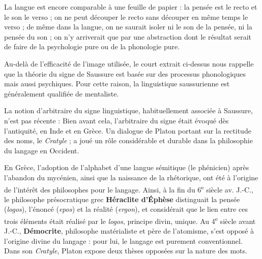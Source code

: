 \begin{lecture}{}
La langue est encore comparable à une feuille de papier : la pensée est le recto et le son le verso ; on ne peut découper le recto sans découper en même temps le verso ; de même dans la langue, on ne saurait isoler ni le son de la pensée, ni la pensée du son ; on n’y arriverait que par une abstraction dont le résultat serait de faire de la psychologie pure ou de la phonologie pure.
\end{lecture}
Au-delà de l’efficacité de l’image utilisée, le court extrait ci-dessus nous rappelle que la théorie du signe de Saussure est basée sur des processus phonologiques mais aussi psychiques. Pour cette raison, la linguistique saussurienne est généralement qualifiée de mentaliste.

La notion d’arbitraire du signe linguistique, habituellement associée à Saussure, n’est pas récente : Bien avant cela, l’arbitraire du signe était évoqué dès l’antiquité, en Inde et en Grèce. Un dialogue de Platon portant sur la rectitude des noms, le \textit{Cratyle} ; a joué un rôle considérable et durable dans la philosophie du langage en Occident.

En Grèce, l’adoption de l’alphabet d’une langue sémitique (le phénicien) après l’abandon du mycénien, ainsi que la naissance de la rhétorique, ont été à l’origine de l’intérêt des philosophes pour le langage. Ainsi, à la fin du 6\textsuperscript{e} siècle av. J.-C., le philosophe présocratique grec \textbf{Héraclite d’Éphèse} distinguait la pensée (\textit{logos}), l’énoncé (\textit{epos}) et la réalité (\textit{ergon}), et considérait que le lien entre ces trois éléments était réalisé par le \textit{logos}, principe divin, unique. Au 4\textsuperscript{e} siècle avant J.-C., \textbf{Démocrite}, philosophe matérialiste et père de l’atomisme, s’est opposé à l’origine divine du langage : pour lui, le langage est purement conventionnel. Dans son \textit{Cratyle}, Platon expose deux thèses opposées sur la nature des mots.


